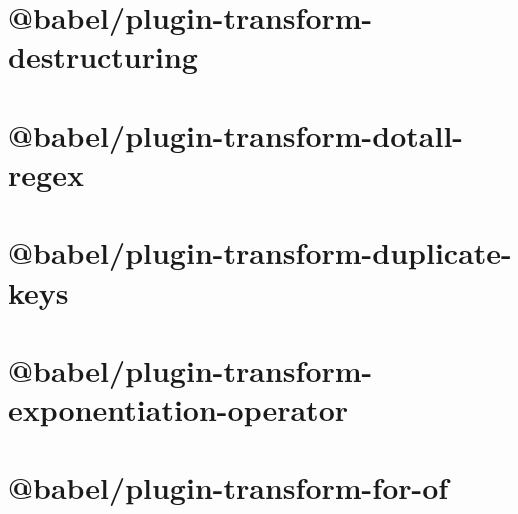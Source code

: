 \documentclass[twoside]{book}
\newcommand{\+}{\discretionary{\mbox{\scriptsize$\hookleftarrow$}}{}{}}
\begin{document}
\chapter{@babel/plugin-\/transform-\/destructuring}
\label{md__c___users_vaishnavi_jadhav__desktop__developer_code_mean_stack_example_client_node_modules__8c13c076a67a054b7834fedf93e59dc1}

\chapter{@babel/plugin-\/transform-\/dotall-\/regex}
\label{md__c___users_vaishnavi_jadhav__desktop__developer_code_mean_stack_example_client_node_modules__11bd44571a4d7f9312a4628ed2091d82}

\chapter{@babel/plugin-\/transform-\/duplicate-\/keys}
\label{md__c___users_vaishnavi_jadhav__desktop__developer_code_mean_stack_example_client_node_modules__1c8880eb019b8360c94a91417521c4ce}

\chapter{@babel/plugin-\/transform-\/exponentiation-\/operator}
\label{md__c___users_vaishnavi_jadhav__desktop__developer_code_mean_stack_example_client_node_modules__7e20c663e5760be496d127e3e9ae3a1a}

\chapter{@babel/plugin-\/transform-\/for-\/of}
\label{md__c___users_vaishnavi_jadhav__desktop__developer_code_mean_stack_example_client_node_modules__00f5d7eeafc881a71011ed7e96ca4f1f}

\end{document}
